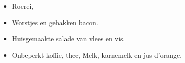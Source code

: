 \begin{itemize}
	\item Roerei,
	\item Worstjes en gebakken bacon.
	\item Huisgemaakte salade van vlees en vis.
	\item Onbeperkt koffie, thee, Melk, karnemelk en jus d’orange.
\end{itemize}
